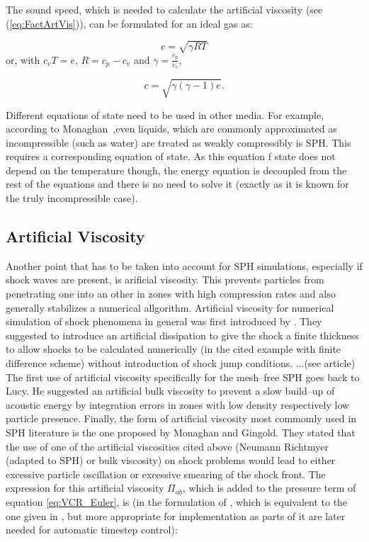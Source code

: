 \documentclass{report}
\begin{document}
The sound speed, which is needed to calculate the artificial viscosity (see (\ref{eq:FactArtVis})), can be formulated for an ideal gas as:

\begin{equation}
\label{eq:soundSpeed}
 c=\sqrt{\gamma R T}
\end{equation}
or, with $c_v T=e$, $R=c_p-c_v$ and $\gamma=\frac{c_p}{c_v}$,

\begin{equation}
 c=\sqrt{\gamma(\gamma-1)e}.
\end{equation}

Different equations of state need to be used in other media. For example, according to Monaghan~\cite{Monaghan1994,Monaghan2005},even liquids, which are commonly approximated
as incompressible (such as water) are treated as weakly compressibly is SPH. This requires a corresponding equation of state. As this equation f state does not depend on the temperature though, the energy equation is decoupled from the rest of the equations and there is no need to solve it (exactly as it is known for the truly incompressible case).



\subsection{Artificial Viscosity}
\label{sec:ArtVisc}

Another point that has to be taken into account for SPH simulations, especially
if shock waves are present, is arificial viscosity\cite{Monaghan2005}. This
prevents particles from penetrating one into an other in zones with high
compression rates and also generally stabilizes a numerical
allgorithm.
Artificial viscosity for numerical simulation of shock phenomena
in general was first introduced by \cite{vonNeumann1950}. They suggested to
introduce an artificial dissipation to give the shock a finite thickness to 
allow shocks to be calculated numerically (in the cited example with finite difference
scheme) without introduction of shock jump conditions.    ...(see article)
The first use of artificial viscosity specifically for the mesh--free SPH goes
back to Lucy\cite{Lucy1977}. He suggested an artificial bulk viscosity to
prevent a slow build--up of acoustic energy by integration errors in zones with
low density respectively low particle presence. 
Finally, the form of artificial viscosity most commomly used in SPH
literature\cite{Liu2003} is the one proposed by Monaghan and
Gingold\cite{Monaghan1983}. They stated that the use of one of the artificial
viscosities cited above (Neumann Richtmyer (adapted to SPH) or bulk
viscosity) on shock problems would lead to either excessive particle
oscillation or excessive smearing of the shock front. The expression for this
artificial viscosity $\Pi_{ab}$, which is added to the pressure term of
equation \ref{eq:VCR_Euler}, is (in the formulation of \cite{Monaghan1992}, which is equivalent to the one given in \cite{Monaghan2005}, but more appropriate for implementation as parts of it are later needed for automatic timestep control):
\end{document}
